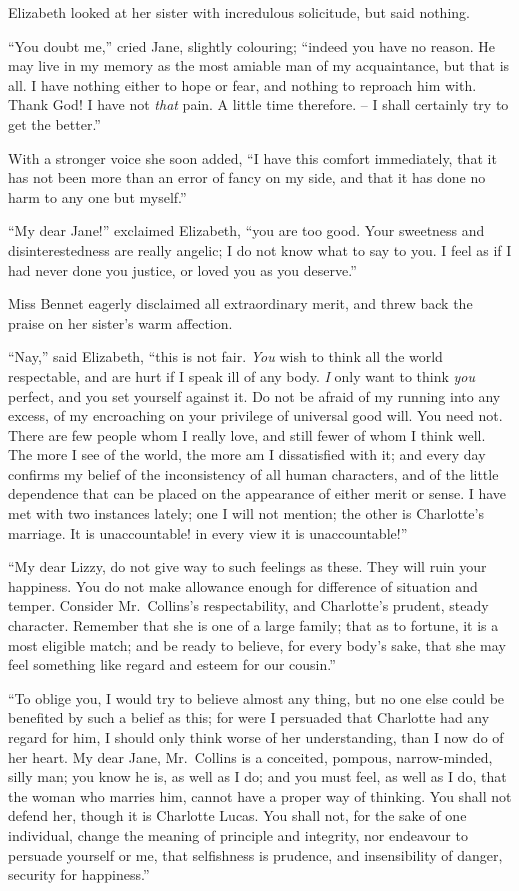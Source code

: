 Elizabeth looked at her sister with incredulous solicitude,
but said nothing.

“You doubt me,” cried Jane, slightly colouring;
“indeed you have no reason. He may live in my memory
as the most amiable man of my acquaintance, but that
is all. I have nothing either to hope or fear, and nothing
to reproach him with. Thank God! I have not \textit{that}
pain. A little time therefore. -- I shall certainly try to
get the better.”

With a stronger voice she soon added, “I have this
comfort immediately, that it has not been more than an
error of fancy on my side, and that it has done no harm
to any one but myself.”

“My dear Jane!” exclaimed Elizabeth, “you are too
good. Your sweetness and disinterestedness are really
angelic; I do not know what to say to you. I feel as if
I had never done you justice, or loved you as you
deserve.”

Miss Bennet eagerly disclaimed all extraordinary merit,
and threw back the praise on her sister’s warm affection.

“Nay,” said Elizabeth, “this is not fair. \textit{You} wish to
think all the world respectable, and are hurt if I speak ill
of any body. \textit{I} only want to think \textit{you} perfect, and you
set yourself against it. Do not be afraid of my running
into any excess, of my encroaching on your privilege of
universal good will. You need not. There are few people
whom I really love, and still fewer of whom I think well.
The more I see of the world, the more am I dissatisfied
with it; and every day confirms my belief of the inconsistency
of all human characters, and of the little dependence
that can be placed on the appearance of either merit
or sense. I have met with two instances lately; one
I will not mention; the other is Charlotte’s marriage.
It is unaccountable! in every view it is unaccountable!”

“My dear Lizzy, do not give way to such feelings as
these. They will ruin your happiness. You do not make
allowance enough for difference of situation and temper.
Consider Mr.\ Collins’s respectability, and Charlotte’s
prudent, steady character. Remember that she is one of
a large family; that as to fortune, it is a most eligible
match; and be ready to believe, for every body’s sake,
that she may feel something like regard and esteem for
our cousin.”

“To oblige you, I would try to believe almost any
thing, but no one else could be benefited by such a belief
as this; for were I persuaded that Charlotte had any
regard for him, I should only think worse of her understanding,
than I now do of her heart. My dear Jane,
Mr.\ Collins is a conceited, pompous, narrow-minded, silly
man; you know he is, as well as I do; and you must
feel, as well as I do, that the woman who marries him,
cannot have a proper way of thinking. You shall not
defend her, though it is Charlotte Lucas. You shall
not, for the sake of one individual, change the meaning
of principle and integrity, nor endeavour to persuade
yourself or me, that selfishness is prudence, and insensibility
of danger, security for happiness.”

